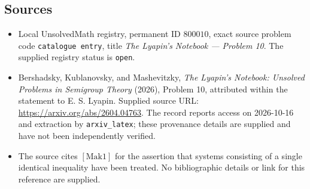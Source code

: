 \documentclass[11pt]{article}
\begin{document}
\subsection{Sources}
\begin{itemize}
\item Local UnsolvedMath registry, permanent ID \(800010\), exact source problem code \texttt{catalogue entry}, title \emph{The Lyapin's Notebook --- Problem 10}. The supplied registry status is \texttt{open}.
\item Bershadsky, Kublanovsky, and Mashevitzky, \emph{The Lyapin's Notebook: Unsolved Problems in Semigroup Theory} (2026), Problem 10, attributed within the statement to E. S. Lyapin. Supplied source URL: \url{https://arxiv.org/abs/2604.04763}. The record reports access on 2026-10-16 and extraction by \texttt{arxiv\_latex}; these provenance details are supplied and have not been independently verified.
\item The source cites \([\mathrm{Mak1}]\) for the assertion that systems consisting of a single identical inequality have been treated. No bibliographic details or link for this reference are supplied.
\end{itemize}
\end{document}
